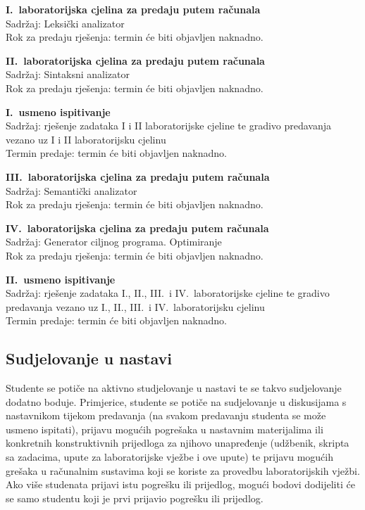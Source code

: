 \documentclass[times, 12pt, utf8]{book}
\begin{document}
\textbf{I.~laboratorijska cjelina za predaju putem računala} \\
Sadržaj: Leksički analizator \\
Rok za predaju rješenja: termin će biti objavljen naknadno.

\textbf{II.~laboratorijska cjelina za predaju putem računala} \\
Sadržaj: Sintaksni analizator \\
Rok za predaju rješenja: termin će biti objavljen naknadno.

\textbf{I.~usmeno ispitivanje} \\
Sadržaj: rješenje zadataka I i II laboratorijske cjeline te gradivo predavanja vezano uz I i II laboratorijsku cjelinu \\
Termin predaje: termin će biti objavljen naknadno.

\textbf{III.~laboratorijska cjelina za predaju putem računala} \\
Sadržaj: Semantički analizator \\
Rok za predaju rješenja: termin će biti objavljen naknadno.

\textbf{IV.~laboratorijska cjelina za predaju putem računala} \\
Sadržaj: Generator ciljnog programa. Optimiranje \\
Rok za predaju rješenja: termin će biti objavljen naknadno.

\textbf{II.~usmeno ispitivanje} \\
Sadržaj: rješenje zadataka I., II., III.~i IV.~laboratorijske cjeline te gradivo predavanja vezano uz I., II., III.~i IV.~laboratorijsku cjelinu \\
Termin predaje: termin će biti objavljen naknadno.

\cleardoublepage  
{}  
{}
\subsection*{Sudjelovanje u nastavi}

Studente se potiče na aktivno studjelovanje u nastavi te se takvo sudjelovanje dodatno boduje.
Primjerice, studente se potiče na sudjelovanje u diskusijama s nastavnikom tijekom predavanja (na svakom predavanju studenta se može usmeno ispitati), prijavu mogućih pogrešaka u nastavnim materijalima ili konkretnih konstruktivnih prijedloga za njihovo unapređenje (udžbenik, skripta sa zadacima, upute za laboratorijske vježbe i ove upute) te prijavu mogućih grešaka u računalnim sustavima koji se koriste za provedbu laboratorijskih vježbi.
Ako više studenata prijavi istu pogrešku ili prijedlog, mogući bodovi dodijeliti će se samo studentu koji je prvi prijavio pogrešku ili prijedlog.
\end{document}
